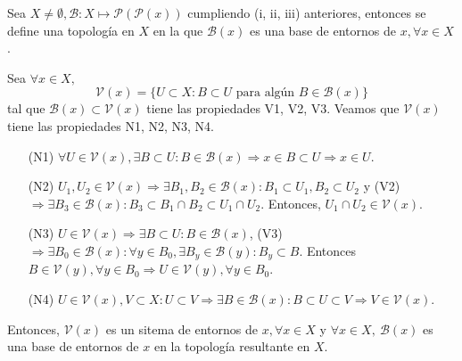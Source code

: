 \begin{prop}
  Sea $ X \neq \emptyset, \mathcal{B}: X \mapsto \mathcal{P}(\mathcal{P}(x))$ cumpliendo (i, ii, iii) anteriores, entonces se define una topología en $X$ en la que $ \mathcal{B}(x)$ es una base de entornos de $x, \forall x \in X$.
\end{prop}

\begin{dem}
  Sea $\forall x \in X,$
  \[
    \mathcal{V}(x) = \{ U \subset X : B \subset U  \text{ para algún } B \in \mathcal{B}(x) \}
  \]
  tal que $\mathcal{B}(x) \subset \mathcal{V}(x)$ tiene las propiedades V1, V2, V3. Veamos que $\mathcal{V}(x)$ tiene las propiedades N1, N2, N3, N4.
  \begin{enumerate}[label=(\roman*)]
    \item [(N1)] $\forall U \in \mathcal{V}(x), \exists B \subset U : B \in \mathcal{B}(x) \Rightarrow x \in B \subset U \Rightarrow x \in U$.
    \item [(N2)] $U_{1}, U_{2} \in \mathcal{V}(x) \Rightarrow \exists B_{1}, B_{2} \in \mathcal{B}(x): B_{1} \subset U_{1}, B_{2} \subset U_{2}$ y (V2) $\Rightarrow \exists B_{3} \in \mathcal{B}(x): B_{3} \subset B_{1} \cap B_{2} \subset U_{1} \cap U_{2}$. Entonces, $U_{1} \cap U_{2} \in \mathcal{V}(x)$.
    \item [(N3)] $U \in \mathcal{V}(x) \Rightarrow \exists B \subset U: B \in \mathcal{B}(x)$, (V3) $ \Rightarrow \exists B_{0} \in \mathcal{B}(x) : \forall y \in B_{0}, \exists B_{y} \in \mathcal{B}(y): B_{y} \subset B$. Entonces $B \in \mathcal{V}(y), \forall y \in B_{0} \Rightarrow U \in \mathcal{V}(y), \forall y \in B_{0}$.
    \item [(N4)] $U \in \mathcal{V}(x), V \subset X: U \subset V \Rightarrow \exists B \in \mathcal{B}(x) : B \subset U \subset V \Rightarrow V \in \mathcal{V}(x)$.
  \end{enumerate}
  
  Entonces, $\mathcal{V}(x)$ es un sitema de entornos de $x, \forall x \in X$ y $\forall x \in X, \ \mathcal{B}(x)$ es una base de entornos de $x$ en la topología resultante en $X$.
\end{dem}

